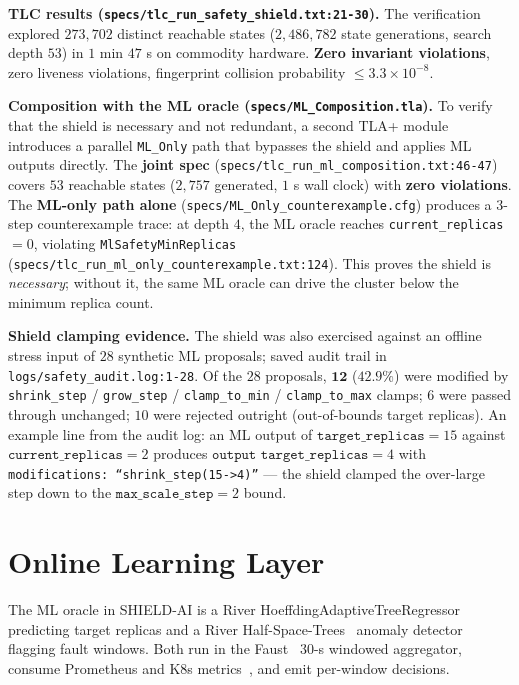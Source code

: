 \documentclass[conference,10pt]{IEEEtran}
\begin{document}
\textbf{TLC results (\texttt{specs/tlc\_run\_safety\_shield.txt:21-30}).}
The verification explored $273{,}702$ distinct reachable states
($2{,}486{,}782$ state generations, search depth $53$) in $1$ min $47$ s on
commodity hardware. \textbf{Zero invariant violations}, zero liveness
violations, fingerprint collision probability
$\leq 3.3 \times 10^{-8}$.

\textbf{Composition with the ML oracle (\texttt{specs/ML\_Composition.tla}).}
To verify that the shield is necessary and not redundant, a second
TLA+ module introduces a parallel \texttt{ML\_Only} path that
bypasses the shield and applies ML outputs directly. The
\textbf{joint spec} (\texttt{specs/tlc\_run\_ml\_composition.txt:46-47})
covers $53$ reachable states ($2{,}757$ generated, $1$ s wall clock)
with \textbf{zero violations}. The \textbf{ML-only path alone}
(\texttt{specs/ML\_Only\_counterexample.cfg}) produces a $3$-step
counterexample trace: at depth $4$, the ML oracle reaches
\texttt{current\_replicas} $= 0$, violating
\texttt{MlSafetyMinReplicas} (\texttt{specs/tlc\_run\_ml\_only\_counterexample.txt:124}).
This proves the shield is \emph{necessary}; without it, the same ML
oracle can drive the cluster below the minimum replica count.

\textbf{Shield clamping evidence.} The shield was also exercised
against an offline stress input of $28$ synthetic ML proposals;
saved audit trail in \texttt{logs/safety\_audit.log:1-28}. Of the
$28$ proposals, $\mathbf{12}$ ($42.9\%$) were modified by
\texttt{shrink\_step} / \texttt{grow\_step} / \texttt{clamp\_to\_min}
/ \texttt{clamp\_to\_max} clamps; $6$ were passed through unchanged;
$10$ were rejected outright (out-of-bounds target replicas). An
example line from the audit log: an ML output of $\texttt{target\_replicas}=15$
against $\texttt{current\_replicas}=2$ produces
$\texttt{output target\_replicas}=4$ with
\texttt{modifications: ``shrink\_step(15->4)''} --- the shield
clamped the over-large step down to the $\texttt{max\_scale\_step}=2$
bound.

\section{Online Learning Layer}
\label{sec:online}

The ML oracle in SHIELD-AI is a River
HoeffdingAdaptiveTreeRegressor~\cite{htr_kdd_2001} predicting target
replicas and a River Half-Space-Trees~\cite{half_space_trees_kdd_2011}
anomaly detector flagging fault windows. Both run in the
Faust~\cite{faust_doc} $30$-s windowed aggregator, consume Prometheus
and K8s metrics~\cite{prometheus_doc}, and emit per-window decisions.
\end{document}
